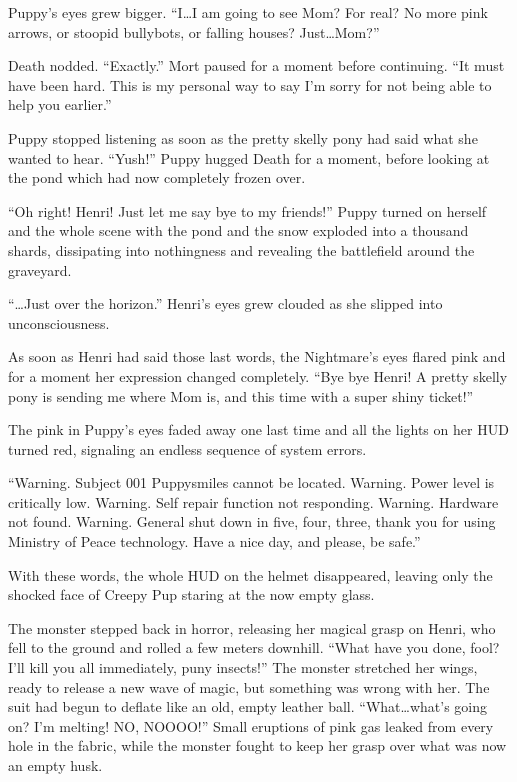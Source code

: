 Puppy's eyes grew bigger. ``I\dots I am going to see Mom? For real? No more pink arrows, or stoopid bullybots, or falling houses? Just\dots Mom?''

Death nodded. ``Exactly.'' Mort paused for a moment before continuing. ``It must have been hard. This is my personal way to say I'm sorry for not being able to help you earlier.''

Puppy stopped listening as soon as the pretty skelly pony had said what she wanted to hear. ``Yush!'' Puppy hugged Death for a moment, before looking at the pond which had now completely frozen over.

``Oh right! Henri! Just let me say bye to my friends!'' Puppy turned on herself and the whole scene with the pond and the snow exploded into a thousand shards, dissipating into nothingness and revealing the battlefield around the graveyard.


\horizonline


``\dots Just over the horizon.'' Henri's eyes grew clouded as she slipped into unconsciousness.

As soon as Henri had said those last words, the Nightmare's eyes flared pink and for a moment her expression changed completely. ``Bye bye Henri! A pretty skelly pony is sending me where Mom is, and this time with a super shiny ticket!''

The pink in Puppy's eyes faded away one last time and all the lights on her HUD turned red, signaling an endless sequence of system errors.

{\mten ``Warning. Subject 001 Puppysmiles cannot be located. Warning. Power level is critically low. Warning. Self repair function not responding. Warning. Hardware not found. Warning. General shut down in five, four, three, thank you for using Ministry of Peace technology. Have a nice day, and please, be safe.''}

With these words, the whole HUD on the helmet disappeared, leaving only the shocked face of Creepy Pup staring at the now empty glass.

The monster stepped back in horror, releasing her magical grasp on Henri, who fell to the ground and rolled a few meters downhill. ``What have you done, fool? I'll kill you all immediately, puny insects!'' The monster stretched her wings, ready to release a new wave of magic, but something was wrong with her. The suit had begun to deflate like an old, empty leather ball. ``What\dots what's going on? I'm melting! NO, NOOOO!'' Small eruptions of pink gas leaked from every hole in the fabric, while the monster fought to keep her grasp over what was now an empty husk.


